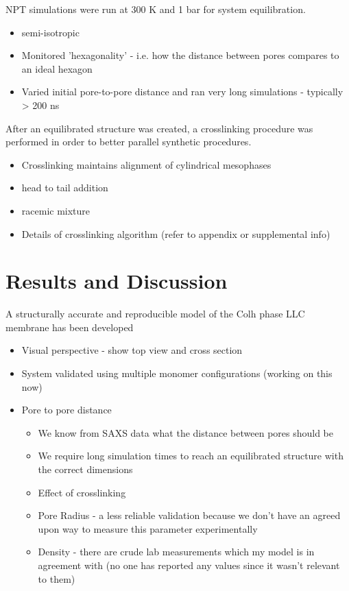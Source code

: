 \documentclass{article}
\begin{document}
	\noindent NPT simulations were run at 300 K and 1 bar for system equilibration.
	\begin{itemize}
		\item semi-isotropic
		\item Monitored 'hexagonality' - i.e. how the distance between pores compares to an ideal hexagon
		\item Varied initial pore-to-pore distance and ran very long simulations - typically > 200 ns
	\end{itemize}
	
	After an equilibrated structure was created, a crosslinking procedure was performed in order to better parallel synthetic procedures. 
	\begin{itemize}
		\item Crosslinking maintains alignment of cylindrical mesophases
		\item head to tail addition
		\item racemic mixture 
		\item Details of crosslinking algorithm (refer to appendix or supplemental info)
	\end{itemize}  
	
	\section{Results and Discussion}
	
	A structurally accurate and reproducible model of the Colh phase LLC membrane has been developed
	\begin{itemize}
		\item Visual perspective - show top view and cross section
		\item System validated using multiple monomer configurations (working on this now)
		\item Pore to pore distance
		\begin{itemize}
			\item We know from SAXS data what the distance between pores should be
			\item We require long simulation times to reach an equilibrated structure with the correct dimensions
			\item Effect of crosslinking
		\item Pore Radius - a less reliable validation because we don't have an agreed upon way to measure this parameter experimentally
		\item Density - there are crude lab measurements which my model is in agreement with (no one has reported any values since it wasn't relevant to them)
		\end{itemize}
	\end{itemize}
	
\end{document}
